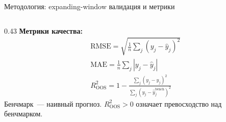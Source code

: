 \documentclass[aspectratio=169,12pt]{beamer}
\begin{document}
\begin{frame}{Методология: expanding-window валидация и метрики}
\begin{columns}[T]
\begin{column}{0.43\textwidth}
    \vspace{0.4em}
    \textbf{\color{hsedark}Метрики качества:}
    \begin{align*}
      &\text{RMSE} = \sqrt{\tfrac{1}{n}\textstyle\sum_j(y_j-\hat{y}_j)^2}\\[4pt]
      &\text{MAE}  = \tfrac{1}{n}\textstyle\sum_j|y_j-\hat{y}_j|\\[4pt]
      &R^2_{\text{OOS}} = 1 -
        \frac{\sum_j(y_j-\hat{y}_j)^2}{\sum_j(y_j-\hat{y}_j^{\text{bench}})^2}
    \end{align*}
    {\small Бенчмарк~— наивный прогноз.
    $R^2_{\text{OOS}}>0$ означает превосходство над бенчмарком.}
  \end{column}
\end{columns}
\end{frame}
\end{document}
